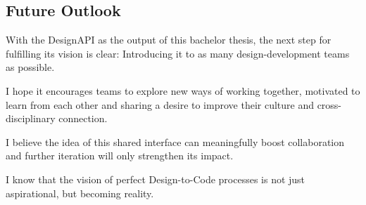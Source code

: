 \newpage
\subsection{Future Outlook}
With the DesignAPI as the output of this bachelor thesis, the next step for fulfilling its vision is
clear: Introducing it to as many design-development teams as possible. 

I hope it encourages teams to explore new ways of working together, motivated to learn from each
other and sharing a desire to improve their culture and cross-disciplinary connection.

I believe the idea of this shared interface can meaningfully boost collaboration and further
iteration will only strengthen its impact.

I know that the vision of perfect Design-to-Code processes is not just aspirational, but becoming
reality.
